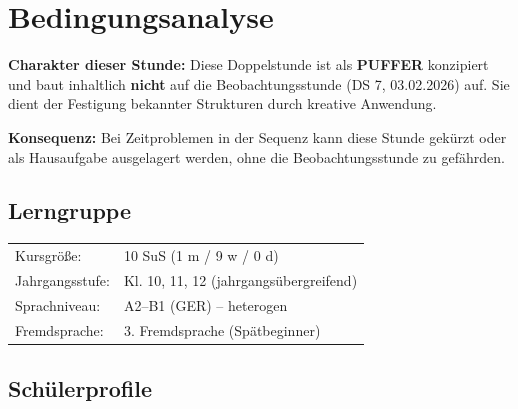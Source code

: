 \documentclass[11pt,a4paper]{article}
\newcommand{\lerngruppengroesse}{10}
\newcommand{\maennlich}{1}
\newcommand{\weiblich}{9}
\newcommand{\divers}{0}
\newcommand{\gerniveau}{A2--B1}
\begin{document}
\tableofcontents
\newpage

\section{Bedingungsanalyse}

\begin{pufferbox}
\textbf{Charakter dieser Stunde:} Diese Doppelstunde ist als \textbf{PUFFER} konzipiert und baut inhaltlich \textbf{nicht} auf die Beobachtungsstunde (DS 7, 03.02.2026) auf. Sie dient der Festigung bekannter Strukturen durch kreative Anwendung.

\textbf{Konsequenz:} Bei Zeitproblemen in der Sequenz kann diese Stunde gekürzt oder als Hausaufgabe ausgelagert werden, ohne die Beobachtungsstunde zu gefährden.
\end{pufferbox}

\subsection{Lerngruppe}
\begin{tabular}{ll}
    Kursgröße: & \lerngruppengroesse{} SuS (\maennlich{} m / \weiblich{} w / \divers{} d) \\
    Jahrgangsstufe: & Kl. 10, 11, 12 (jahrgangsübergreifend) \\
    Sprachniveau: & \gerniveau{} (GER) -- heterogen \\
    Fremdsprache: & 3. Fremdsprache (Spätbeginner) \\
\end{tabular}

\subsection{Schülerprofile}
\end{document}
